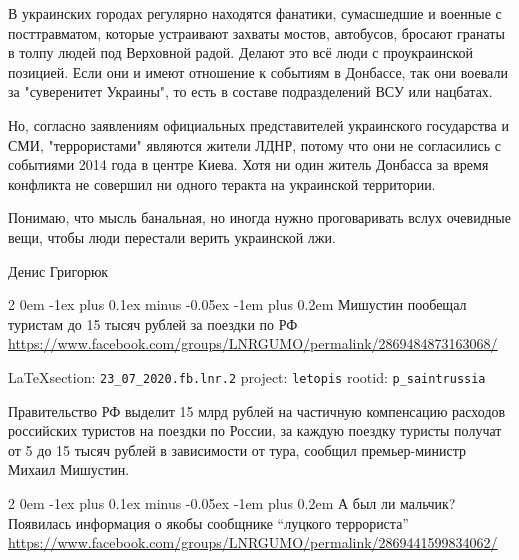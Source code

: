 \documentclass[a4paper,11pt]{extreport}
\makeatletter
\renewcommand\subsection{%
  \clearpage
    \@startsection{subsection}%
    {2}%
    {0em}%
    {-1ex plus 0.1ex minus -0.05ex}%
    {-1em plus 0.2em}%
    {\scshape\bfseries\Large}%
}
\makeatother
\begin{document}
В украинских городах регулярно находятся фанатики, сумасшедшие и военные с
посттравматом, которые устраивают захваты мостов, автобусов, бросают гранаты в
толпу людей под Верховной радой. Делают это всё люди с проукраинской позицией.
Если они и имеют отношение к событиям в Донбассе, так они воевали за
"суверенитет Украины", то есть в составе подразделений ВСУ или нацбатах.

Но, согласно заявлениям официальных представителей украинского государства и
СМИ, "террористами" являются жители ЛДНР, потому что они не согласились с
событиями 2014 года в центре Киева. Хотя ни один житель Донбасса за время
конфликта не совершил ни одного теракта на украинской территории.

Понимаю, что мысль банальная, но иногда нужно проговаривать вслух очевидные
вещи, чтобы люди перестали верить украинской лжи.

Денис Григорюк
  
 
 

\subsection{Мишустин пообещал туристам до 15 тысяч рублей за поездки по РФ}
\label{sec:23_07_2020.fb.lnr.2}
\url{https://www.facebook.com/groups/LNRGUMO/permalink/2869484873163068/}
  
\vspace{0.5cm}
{\small\LaTeX section: \verb|23_07_2020.fb.lnr.2| project: \verb|letopis| rootid: \verb|p_saintrussia|}
\vspace{0.5cm}

Правительство РФ выделит 15 млрд рублей на частичную компенсацию расходов
российских туристов на поездки по России, за каждую поездку туристы получат от
5 до 15 тысяч рублей в зависимости от тура, сообщил премьер-министр Михаил
Мишустин.
 
 
\subsection{А был ли мальчик? Появилась информация о якобы сообщнике ``луцкого террориста''}
\label{sec:23_07_2020.fb.lnr.3}
\url{https://www.facebook.com/groups/LNRGUMO/permalink/2869441599834062/}
\end{document}
